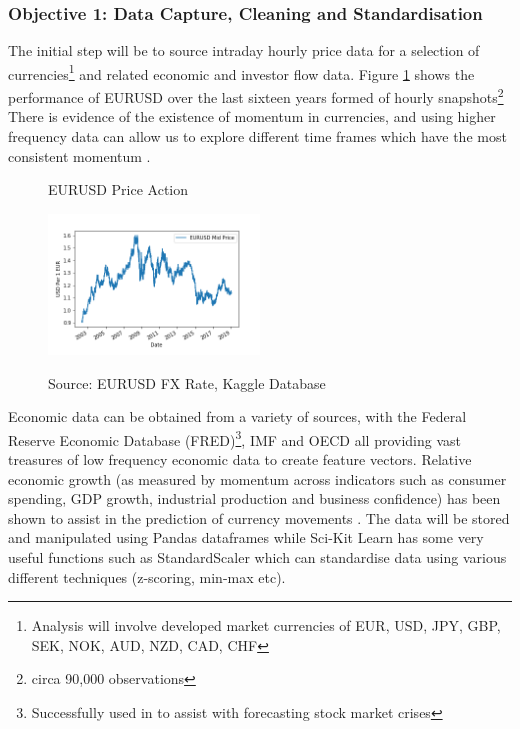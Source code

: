 \documentclass[11pt, a4paper]{article}
\begin{document}
\subsubsection{Objective 1: Data Capture, Cleaning and Standardisation}

The initial step will be to source intraday hourly price data for a selection of currencies\footnote{Analysis will involve developed market currencies of EUR, USD, JPY, GBP, SEK, NOK, AUD, NZD, CAD, CHF} and related economic and investor flow data. Figure \ref{fig:EURUSDPrice} shows the performance of EURUSD over the last sixteen years formed of hourly snapshots\footnote{circa 90,000 observations}
\newline There is evidence of the existence of momentum in currencies, and using higher frequency data can allow us to explore different time frames which have the most consistent momentum \cite{Filippou2017}. 
\begin{figure}[h]
    \centering
	\caption{EURUSD Price Action}
    \includegraphics[width=0.5\textwidth]{EURUSDPrice}   
    \label{fig:EURUSDPrice}
\caption*{Source: EURUSD FX Rate, Kaggle Database}
\end{figure}
Economic data can be obtained from a variety of sources, with the Federal Reserve Economic Database (FRED)\footnote{Successfully used in \cite{Chatzis2018} to assist with forecasting stock market crises}, IMF and OECD all providing vast treasures of low frequency economic data to create feature vectors. Relative economic growth (as measured by momentum across indicators such as consumer spending, GDP growth, industrial production and business confidence) has been shown to assist in the prediction of currency movements \cite{Dahlquist2015}.  
\newline The data will be stored and manipulated using Pandas dataframes while Sci-Kit Learn has some very useful functions such as StandardScaler which can standardise data using various different techniques (z-scoring, min-max etc).
\end{document}
